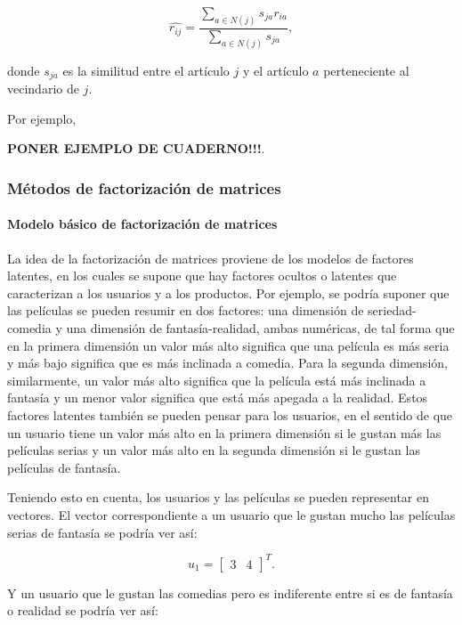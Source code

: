 \begin{equation}\label{predic_modelo_articulo_ponderado}
 \hat{r_{ij}} = \frac{\sum_{a \in N(j)} s_{ja} r_{ia}}{\sum_{a \in N(j)} s_{ja}},
\end{equation}

donde $s_{ja}$ es la similitud entre el artículo $j$ y el artículo $a$ perteneciente al vecindario de $j$.

Por ejemplo,

\textbf{PONER EJEMPLO DE CUADERNO!!!}.

\subsubsection{Métodos de factorización de matrices} \label{sec:modelo_factorizacion}

\paragraph{Modelo básico de factorización de matrices}

La idea de la factorización de matrices proviene de los modelos de factores latentes, en los cuales se supone que hay factores ocultos o latentes que caracterizan a los usuarios y a los productos. Por ejemplo, se podría suponer que las películas se pueden resumir en dos factores: una dimensión de seriedad-comedia y una dimensión de fantasía-realidad, ambas numéricas, de tal forma que en la primera dimensión un valor más alto significa que una película es más seria y más bajo significa que es más inclinada a comedia. Para la segunda dimensión, similarmente, un valor más alto significa que la película está más inclinada a fantasía y un menor valor significa que está más apegada a la realidad. Estos factores latentes también se pueden pensar para los usuarios, en el sentido de que un usuario tiene un valor más alto en la primera dimensión si le gustan más las películas serias y un valor más alto en la segunda dimensión si le gustan las películas de fantasía.

Teniendo esto en cuenta, los usuarios y las películas se pueden representar en vectores. El vector correspondiente a un usuario que le gustan mucho las películas serias de fantasía se podría ver así:

\[
     u_1 = 
    \begin{bmatrix}
        3 & 4
    \end{bmatrix}^{T}.
\]
  
Y un usuario que le gustan las comedias pero es indiferente entre si es de fantasía o realidad se podría ver así:

